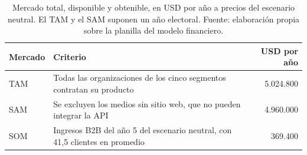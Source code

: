 \begin{table}[t]
  \centering
  \small
  \caption{Mercado total, disponible y obtenible, en USD por año a precios del escenario neutral. El TAM y el SAM suponen un año electoral. Fuente: elaboración propia sobre la planilla del modelo financiero.}
  \label{tab:financiero-mercado}
  \begin{tabular}{l p{8.4cm} r}
    \hline
    \textbf{Mercado} & \textbf{Criterio} & \textbf{USD por año} \\
    \hline
    TAM & Todas las organizaciones de los cinco segmentos contratan su producto & 5.024.800 \\
    SAM & Se excluyen los medios sin sitio web, que no pueden integrar la API & 4.960.000 \\
    SOM & Ingresos B2B del año 5 del escenario neutral, con 41,5 clientes en promedio & 369.400 \\
    \hline
  \end{tabular}
\end{table}

